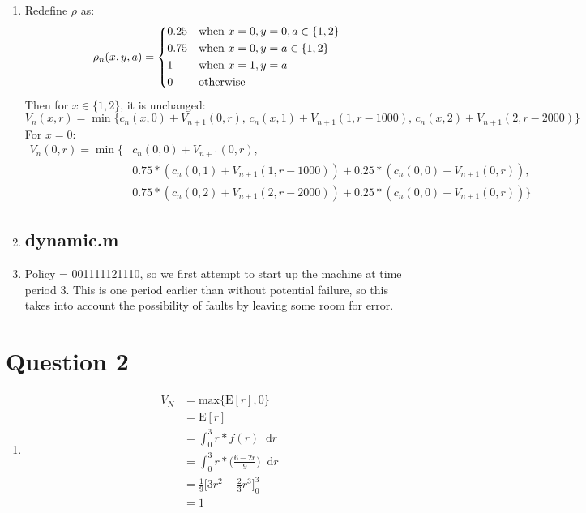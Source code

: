 \documentclass[10pt,a4paper]{article}
\newcommand*\diff{\mathop{}\!\mathrm{d}}
\begin{document}
\begin{enumerate}
	\item Redefine \(\rho\) as: \\
	\[
	\rho_n(x, y, a) = \begin{dcases*}
	0.25 & when $x=0, y=0, a \in \{1, 2\}$ \\
	0.75 & when $x=0, y=a \in \{1, 2\}$ \\
	1 & when $x=1, y=a$ \\
	0 & otherwise
	\end{dcases*}
	\]
	Then for \(x \in \{1, 2\}\), it is unchanged:
	\begin{equation*}
	V_n(x, r) = \min\bigg\{c_n(x, 0) + V_{n+1}(0, r),\, c_n(x, 1) + V_{n+1}(1, r-1000),\, c_n(x, 2) + V_{n+1}(2, r-2000)\bigg\}
	\end{equation*}
	For \(x=0\):
	\begin{align*}
	V_n(0, r) = \min\bigg\{&c_n(0, 0) + V_{n+1}(0, r),\\
	&0.75*(c_n(0, 1) + V_{n+1}(1, r-1000)) + 0.25*(c_n(0, 0) + V_{n+1}(0, r)),\\
	&0.75*(c_n(0, 2) + V_{n+1}(2, r-2000)) + 0.25*(c_n(0, 0) + V_{n+1}(0, r))
	\bigg\}
	\end{align*}
	
	\newpage
	\item \subsection*{dynamic.m} 
	
	\newpage
	\item Policy = 001111121110, so we first attempt to start up the machine at time period 3. This is one period earlier than without potential failure, so this takes into account the possibility of faults by leaving some room for error.

\end{enumerate}

\section*{Question 2}
\begin{enumerate}
	\item \begin{align*}
	V_N &= \text{max}\{\text{E}[r], 0\} \\
	&= \text{E}[r] \\
	&= \int^3_0 r * f(r) \diff r \\
	&= \int^3_0 r * \bigg(\frac{6-2r}{9}\bigg) \diff r \\
	&= \frac{1}{9} \bigg[3r^2-\frac{2}{3}r^3\bigg]^3_0 \\
	&= 1
	\end{align*}
\end{enumerate}	
	
\end{document}
